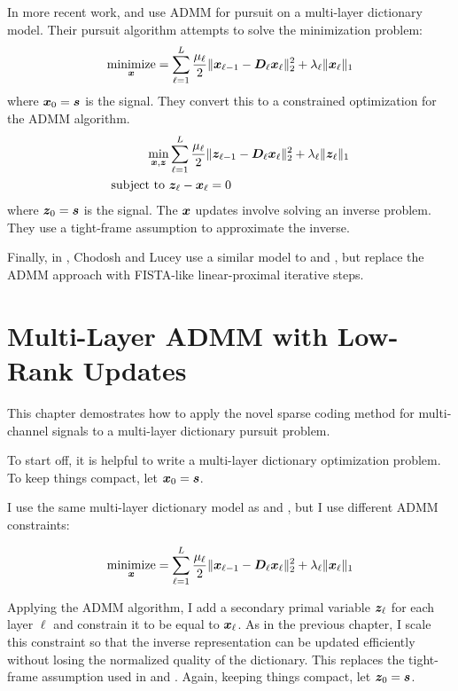 In more recent work, \cite{murdock2018deep} and \cite{chodosh2018deep} use ADMM for pursuit on a multi-layer dictionary model. Their pursuit algorithm attempts to solve the minimization problem:
\begin{equation}
\operatorname*{\text{minimize}}_{\bm{x}} = \sum_{\ell = 1}^{L} \frac{\mu_{\ell}}{2}\|\bm{x}_{\ell - 1} -\bm{D}_{\ell}\bm{x}_{\ell}\|_2^2 + \lambda_{\ell}\|\bm{x}_{\ell}\|_1
\end{equation}
where $\bm{x}_0 = \bm{s}$ is the signal. They convert this to a constrained optimization for the ADMM algorithm.
\begin{equation}
\begin{aligned}
\min_{\bm{x},\bm{z}} & \sum_{\ell = 1}^{L} \frac{\mu_{\ell}}{2}\|\bm{z}_{\ell - 1} -\bm{D}_{\ell}\bm{x}_{\ell}\|_2^2 + \lambda_{\ell}\|\bm{z}_{\ell}\|_1 \\
\text{subject to } & \bm{z}_{\ell} - \bm{x}_{\ell} = 0
\end{aligned}
\end{equation}
where $\bm{z}_0 = \bm{s}$ is the signal. The $\bm{x}$ updates involve solving an inverse problem. They use a tight-frame assumption to approximate the inverse.

Finally, in \cite{chodosh2020use}, Chodosh and Lucey use a similar model to \cite{murdock2018deep} and \cite{chodosh2018deep}, but replace the ADMM approach with FISTA-like linear-proximal iterative steps.

\section{Multi-Layer ADMM with Low-Rank Updates}
This chapter demostrates how to apply the novel sparse coding method for multi-channel signals to a multi-layer dictionary pursuit problem.

To start off, it is helpful to write a multi-layer dictionary optimization problem. To keep things compact, let $\bm{x}_0 = \bm{s}$.

I use the same multi-layer dictionary model as \cite{murdock2018deep} and \cite{chodosh2018deep}, but I use different ADMM constraints:

\begin{equation}
\operatorname*{\text{minimize}}_{\bm{x}} = \sum_{\ell = 1}^{L} \frac{\mu_{\ell}}{2}\|\bm{x}_{\ell - 1} -\bm{D}_{\ell}\bm{x}_{\ell}\|_2^2 + \lambda_{\ell}\|\bm{x}_{\ell}\|_1
\end{equation}

Applying the ADMM algorithm, I add a secondary primal variable $\bm{z}_{\ell}$ for each layer $\ell$ and constrain it to be equal to $\bm{x}_{\ell}$. As in the previous chapter, I scale this constraint so that the inverse representation can be updated efficiently without losing the normalized quality of the dictionary. This replaces the tight-frame assumption used in \cite{murdock2018deep} and \cite{chodosh2018deep}. Again, keeping things compact, let $\bm{z}_0 = \bm{s}$.


